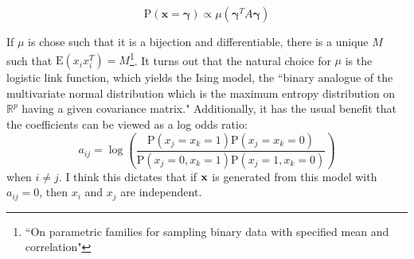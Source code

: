 \documentclass[11pt]{article}
\newcommand{\R}{\mathbb{R}}
\newcommand{\p}{\mathrm{P}}
\newcommand{\E}{\mathrm{E}}
\theoremstyle{definition}
\begin{document}
    \[ \p(\mathbf x=\mathbf \gamma) \propto \mu(\mathbf{\gamma}^T A\mathbf \gamma)\]

    If $\mu$ is chose such that it is a bijection and differentiable, there is a unique $M$ such that $\E(x_ix_i^T)=M$\footnote{``On parametric families for sampling binary data with specified mean and correlation"}. It turns out that the natural choice for $\mu$ is the logistic link function, which yields the Ising model, the ``binary analogue of the multivariate normal distribution which is the maximum entropy distribution on $\R^p$ having a given covariance matrix." Additionally, it has the usual benefit that the coefficients can be viewed as a log odds ratio:
    \[a_{ij} = \log\left(\frac{\p(x_j=x_k=1)\p(x_j=x_k=0)}{\p(x_j=0,x_k=1)\p(x_j=1,x_k=0)}\right) \]
    when $i\neq j$. I think this dictates that if $\bf x$ is generated from this model with $a_{ij}=0$, then $x_i$ and $x_j$ are independent.  \par
\end{document}
